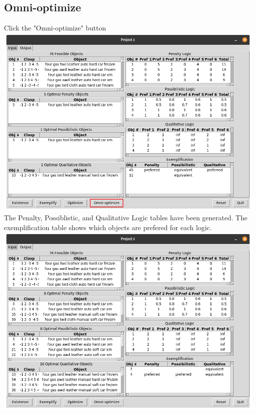 \documentclass[titlepage]{article}
\begin{document}
\subsection{Omni-optimize} Click the "Omni-optimize" button\\
\includegraphics[scale=0.3]{omni-optimize}\\
The Penalty, Possiblistic, and Qualitative Logic tables have been generated. The exemplification table shows which objects are prefered for each logic.\\
\includegraphics[scale=0.3]{post_omni-optimize}
\end{document}
